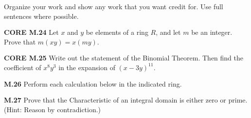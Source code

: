 \documentclass[addpoints]{exam}
\begin{document}
Organize your work and show any work that you want credit for. Use full sentences where possible.

\begin{questions}

\question \textbf{CORE M.24}
Let $x$ and $y$ be elements of a ring $R$, and let $m$ be an integer. Prove that $m(xy)=x(my)$. 

\question \textbf{CORE M.25}
Write out the statement of the Binomial Theorem. Then find the coefficient of $x^8y^3$ in the expansion of $(x-3y)^{11}$.

\question \textbf{M.26}
Perform each calculation below in the indicated ring.

\question \textbf{M.27}
Prove that the Characteristic of an integral domain is either zero or prime. (Hint: Reason by contradiction.)




\end{questions}
\end{document}
